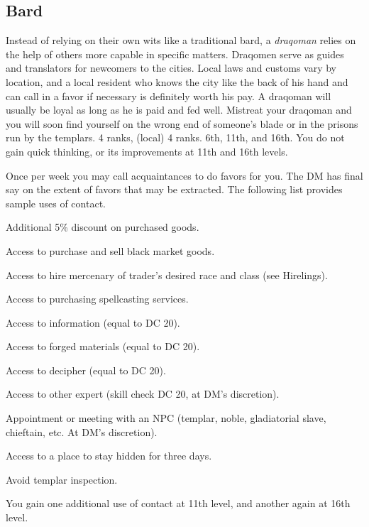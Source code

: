 \subsection{Bard}
{Instead of relying on their own wits like a traditional bard, a \emph{draqoman} relies on the help of others more capable in specific matters. Draqomen serve as guides and translators for newcomers to the cities. Local laws and customs vary by location, and a local resident who knows the city like the back of his hand and can call in a favor if necessary is definitely worth his pay. A draqoman will usually be loyal as long as he is paid and fed well. Mistreat your draqoman and you will soon find yourself on the wrong end of someone's blade or in the prisons run by the templars.}
{ 4 ranks,  (local) 4 ranks.}
{6th, 11th, and 16th.}
{You do not gain quick thinking, or its improvements at 11th and 16th levels.}
{
	Once per week you may call acquaintances to do favors for you. The DM has final say on the extent of favors that may be extracted. The following list provides sample uses of contact.

\begin{itemize*}
\item Additional 5\% discount on purchased goods.
\item Access to purchase and sell black market goods.
\item Access to hire mercenary of trader's desired race and class (see Hirelings).
\item Access to purchasing spellcasting services.
\item Access to information (equal to  DC 20).
\item Access to forged materials (equal to  DC 20).
\item Access to decipher (equal to  DC 20).
\item Access to other expert (skill check DC 20, at DM's discretion).
\item Appointment or meeting with an NPC (templar, noble, gladiatorial slave, chieftain, etc. At DM's discretion).
\item Access to a place to stay hidden for three days.
\item Avoid templar inspection.
\end{itemize*}

	You gain one additional use of contact at 11th level, and another again at 16th level.
}

